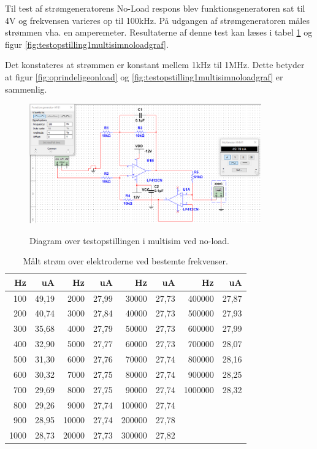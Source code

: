 Til test af strømgeneratorens No-Load respons blev funktionsgeneratoren sat til 4V og frekvensen varieres op til 100kHz. På udgangen af strømgeneratoren måles strømmen vha. en amperemeter. Resultaterne af denne test kan læses i tabel \ref{table:frekvensernoload} og figur \ref{fig:testopstilling1multisimnoloadgraf}.

Det konstateres at strømmen er konstant mellem 1kHz til 1MHz. Dette betyder at figur \ref{fig:oprindeligeonload} og  \ref{fig:testopstilling1multisimnoloadgraf} er sammenlig.   

\begin{figure}[H]
\centering
{\includegraphics[width=10cm]
{Figure/testopstilling1multisimnoload}}
\caption{Diagram over testopstillingen i multisim ved no-load. }
\label{fig:testopstilling1multisimnoload}
\end{figure}


\begin{table}[H]
\centering
\begin{tabular}{| r | r || r | r || r | r || r | r |}
    \hline
    \textbf{Hz} & \textbf{uA} & \textbf{Hz} & \textbf{uA} & \textbf{Hz} & \textbf{uA} & \textbf{Hz} & \textbf{uA}\\ \hline
    100 & 49,19 & 2000 & 27,99 & 30000 & 27,73 & 400000 & 27,87  \\ \hline
    200 & 40,74 & 3000 & 27,84 & 40000 & 27,73 & 500000 & 27,93  \\ \hline
    300 & 35,68 & 4000 & 27,79 & 50000 & 27,73 & 600000 & 27,99  \\ \hline
    400 & 32,90 & 5000 & 27,77 & 60000 & 27,73 & 700000 & 28,07  \\ \hline
    500 & 31,30 & 6000 & 27,76 & 70000 & 27,74 & 800000 & 28,16  \\ \hline
    600 & 30,32 & 7000 & 27,75 & 80000 & 27,74 & 900000 & 28,25  \\ \hline
    700 & 29,69 & 8000 & 27,75 & 90000 & 27,74 & 1000000 & 28,32  \\ \hline
    800 & 29,26 & 9000 & 27,74 & 100000 & 27,74 &  &   \\ \hline
    900 & 28,95 & 10000 & 27,74 & 200000 & 27,78 &  &   \\ \hline
    1000 & 28,73 & 20000 & 27,73 & 300000 & 27,82 &  &  \\ \hline
\end{tabular}
    \caption{Målt strøm over elektroderne ved bestemte frekvenser.}
    \label{table:frekvensernoload}
\end{table} 


